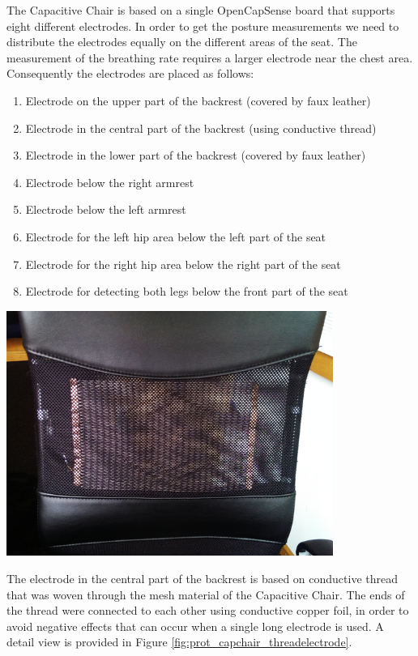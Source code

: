 The Capacitive Chair is based on a single OpenCapSense board that supports eight different electrodes. In order to get the posture measurements we need to distribute the electrodes equally on the different areas of the seat. The measurement of the breathing rate requires a larger electrode near the chest area. Consequently the electrodes are placed as follows:
\begin{enumerate}
\item Electrode on the upper part of the backrest (covered by faux leather)
\item Electrode in the central part of the backrest (using conductive thread)
\item Electrode in the lower part of the backrest (covered by faux leather)
\item Electrode below the right armrest
\item Electrode below the left armrest
\item Electrode for the left hip area below the left part of the seat
\item Electrode for the right hip area below the right part of the seat
\item Electrode for detecting both legs below the front part of the seat
\end{enumerate}

\begin{minipage}{\linewidth}
\centering
\includegraphics[width=0.8\textwidth]{images/prot_capchair_threadelectrode}
\label{fig:prot_capchair_threadelectrode}
\end{minipage}

The electrode in the central part of the backrest is based on conductive thread that was woven through the mesh material of the Capacitive Chair. The ends of the thread were connected to each other using conductive copper foil, in order to avoid negative effects that can occur when a single long electrode is used. A detail view is provided in Figure \ref{fig:prot_capchair_threadelectrode}.
 
